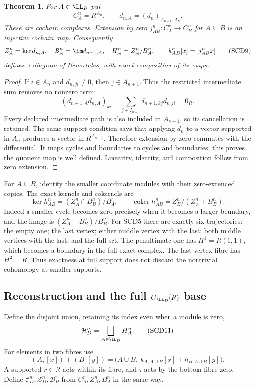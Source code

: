 \documentclass[11pt,a4paper]{article}
\newtheorem{theorem}{Theorem}[section]
\theoremstyle{definition}\newtheorem{definition}[theorem]{Definition}
\begin{document}
\begin{theorem}
For \(A\in\LL_D\) put
\[
 C_A^n=R^{A_n},\qquad d_{n,A}=(d_n)_{A_{n+1},A_n}.
 \tag{SCD8}
\]
These are cochain complexes. Extension by zero \(j_{AB}^n:C_A^n\to C_B^n\)
for \(A\subseteq B\) is an injective cochain map. Consequently
\[
 Z_A^n=\ker d_{n,A},\quad B_A^n=\im d_{n-1,A},\quad
 H_A^n=Z_A^n/B_A^n,\qquad
 h_{AB}^n[x]=[j_{AB}^nx]
 \tag{SCD9}
\]
defines a diagram of \(R\)-modules, with exact composition of its maps.
\end{theorem}
\begin{proof}
If \(i\in A_n\) and \(d_{n,ji}\ne0\), then \(j\in A_{n+1}\).
Thus the restricted intermediate sum removes no nonzero term:
\[
 (d_{n+1,A}d_{n,A})_{ki}
 =\sum_{j\in I_{n+1}}d_{n+1,kj}d_{n,ji}=0_R.
\]
Every declared intermediate path is also included in \(A_{n+1}\),
so its cancellation is retained. The same support condition says
that applying \(d_n\) to a vector supported in \(A_n\) produces
a vector in \(R^{A_{n+1}}\). Therefore extension by zero commutes
with the differential. It maps cycles and boundaries to cycles
and boundaries; this proves the quotient map is well defined.
Linearity, identity, and composition follow from zero extension.
\end{proof}

For \(A\subseteq B\), identify the smaller coordinate modules with
their zero-extended copies. The exact kernels and cokernels are
\[
 \ker h_{AB}^n=(Z_A^n\cap B_B^n)/B_A^n,\qquad
 \operatorname{coker}h_{AB}^n=Z_B^n/(Z_A^n+B_B^n).
 \tag{SCD10}
\]
Indeed a smaller cycle becomes zero precisely when it becomes a
larger boundary, and the image is
\((Z_A^n+B_B^n)/B_B^n\).
For SCD5 there are exactly six trajectories: the empty one; the
last vertex; either middle vertex with the last; both middle vertices
with the last; and the full set. The penultimate one has
\(H^1=R(1,1)\), which becomes a boundary in the full exact complex.
The last-vertex fibre has \(H^2=R\). Thus exactness at full support
does not discard the nontrivial cohomology at smaller supports.

\subsection{Reconstruction and the full \(G_{\LL_D}(R)\) base}

Define the disjoint union, retaining its index even when a module is zero,
\[
 \mathcal H_D^n=\bigsqcup_{A\in\LL_D}H_A^n.
 \tag{SCD11}
\]
For elements in two fibres use
\[
 (A,[x])+(B,[y])
 =\bigl(A\cup B,\ h_{A,A\cup B}[x]+h_{B,A\cup B}[y]\bigr).
 \tag{SCD12}
\]
A supported \(r\in R\) acts within its fibre, and \(\tau\) acts by
the bottom-fibre zero. Define \(\mathcal C_D^n,\mathcal Z_D^n,
\mathcal B_D^n\) from \(C_A^n,Z_A^n,B_A^n\) in the same way.
\end{document}
